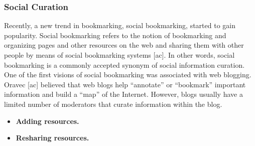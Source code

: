 \documentclass{casconpaper}
\begin{document}
{\subsubsection{Social Curation}
Recently, a new trend in bookmarking, social bookmarking, started to gain popularity. Social bookmarking refers to the notion of bookmarking and organizing pages and other resources on the web and sharing them with other people by means of social bookmarking systems [ac]. In other words, social bookmarking is a commonly accepted synonym of social information curation. One of the first visions of social bookmarking was associated with web blogging. Oravec [ac] believed that web blogs help “annotate” or “bookmark” important information and build a “map” of the Internet. However, blogs usually have a limited number of moderators that curate information within the blog. 
\begin{itemize}
  \item \textbf{Adding resources.} 
  \item \textbf{Resharing resources.}
 
\end{itemize}
} %
\end{document}
